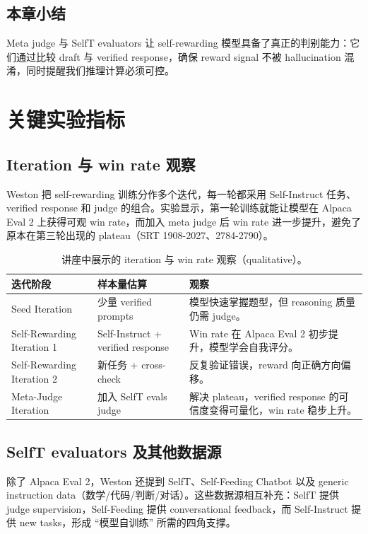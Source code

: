 \documentclass[a4paper]{article}
\begin{document}
\subsection{本章小结}
Meta judge 与 SelfT evaluators 让 self-rewarding 模型具备了真正的判别能力：它们通过比较 draft 与 verified response，确保 reward signal 不被 hallucination 混淆，同时提醒我们推理计算必须可控。

\section{关键实验指标}
\subsection{Iteration 与 win rate 观察}
Weston 把 self-rewarding 训练分作多个迭代，每一轮都采用 Self-Instruct 任务、verified response 和 judge 的组合。实验显示，第一轮训练就能让模型在 Alpaca Eval 2 上获得可观 win rate，而加入 meta judge 后 win rate 进一步提升，避免了原本在第三轮出现的 plateau（SRT 1908-2027、2784-2790）。

\begin{table}[H]
\centering
\begin{tabular}{p{4cm}p{4cm}p{7cm}}
\toprule
迭代阶段 & 样本量估算 & 观察 \\
\midrule
Seed Iteration & 少量 verified prompts & 模型快速掌握题型，但 reasoning 质量仍需 judge。 \\
Self-Rewarding Iteration 1 & Self-Instruct + verified response & Win rate 在 Alpaca Eval 2 初步提升，模型学会自我评分。 \\
Self-Rewarding Iteration 2 & 新任务 + cross-check & 反复验证错误，reward 向正确方向偏移。 \\
Meta-Judge Iteration & 加入 SelfT evals judge & 解决 plateau，verified response 的可信度变得可量化，win rate 稳步上升。 \\
\bottomrule
\end{tabular}
\caption{讲座中展示的 iteration 与 win rate 观察（qualitative）。}
\end{table}

\subsection{SelfT evaluators 及其他数据源}
除了 Alpaca Eval 2，Weston 还提到 SelfT、Self-Feeding Chatbot 以及 generic instruction data（数学/代码/判断/对话）。这些数据源相互补充：SelfT 提供 judge supervision，Self-Feeding 提供 conversational feedback，而 Self-Instruct 提供 new tasks，形成 ``模型自训练'' 所需的四角支撑。
\end{document}
